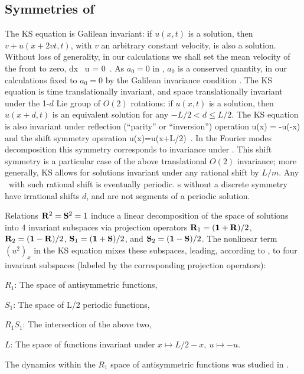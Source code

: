 \subsection{Symmetries of \KSe}
\label{sec:KSeSymm}

The  KS equation is
Galilean invariant: if $u(x,t)$ is a solution, then 
$v+u(x+2vt,t)$, with $v$ an arbitrary constant velocity, is also a solution. 
Without loss of generality, in our calculations we shall set 
the mean velocity of the  front to zero,
\beq
\int dx \, u = 0
\,.
As  $\dot{a_0}=0$ in , 
$a_0$ is a conserved quantity, in our calculations
fixed to $a_0=0$ by the Galilean invariance condition .
The KS equation   is time translationally invariant,
and 
space translationally invariant
under the 1-$d$ Lie group of $O(2)$ rotations: if
$u(x,t)$ is a solution, then $u(x+d,t)$ is an equivalent
solution for any $-L/2 < d \leq L/2$.
The KS equation is also invariant under
reflection (``parity'' or ``inversion'') operation
\beq
\Refl u(x) = -u(-x)
and the shift symmetry operation 
\beq
\Shift u(x)=u(x+L/2)
\,. 
In the Fourier modes decomposition  this
symmetry corresponds to invariance under
.
This shift symmetry is a particular case of the
above translational $O(2)$ invariance; more generally,
KS allows for solutions invariant under any rational shift by
$L/m$. Any \rpo\ with such rational shift is eventually periodic.
\Rpo s without a discrete symmetry have irrational shifts
$d$, and are not segments of a periodic solution.


Relations $\mathbf{R}^2=\mathbf{S}^2=1$
induce a linear decomposition of the space of solutions into 4 invariant
subspaces via projection operators
$\mathbf{R}_1=(\mathbf 1+\mathbf{R})/2$,
$\mathbf{R}_2=(\mathbf 1-\mathbf{R})/2$,
$\mathbf{S}_1=(\mathbf 1+\mathbf{S})/2$, and
$\mathbf{S}_2=(\mathbf 1-\mathbf{S})/2$. The nonlinear term $(u^2)_x$ in the KS equation
mixes these subspaces, leading,
according to , to four invariant subspaces
(labeled by the corresponding projection operators):
\begin{romannum} %

 \item[$R_1$:] The space of antisymmetric functions,
 \item[$S_1$:] The space of L/2 periodic functions,
 \item[$R_1 S_1$:] The intersection of the above two,
 \item[$L$:] The space of functions invariant under $x\mapsto L/2-x,\ u\mapsto -u$.
 
\end{romannum} %
The dynamics within the $R_1$ space of antisymmetric functions
was studied in .


